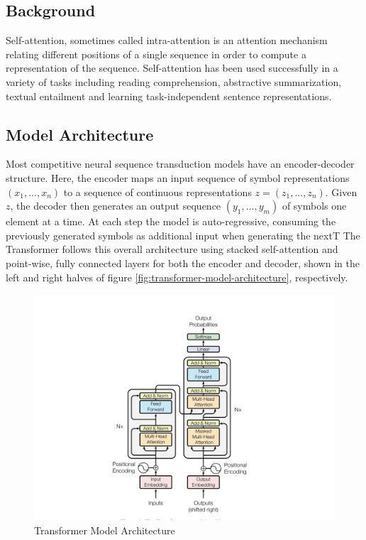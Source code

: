 \documentclass{report}
\begin{document}
\subsection{Background}
\label{ssec:transformers-background}
Self-attention, sometimes called intra-attention is an attention mechanism relating different positions of a single sequence in order to compute a representation of the sequence. Self-attention has been used successfully in a variety of tasks including reading comprehension, abstractive summarization, textual entailment and learning task-independent sentence representations.

\subsection{Model Architecture}
\label{ssec:transformers-model-architecture}
Most competitive neural sequence transduction models have an encoder-decoder structure. Here, the encoder maps an input sequence of symbol representations $(x_1,...,x_n)$ to a sequence of continuous representations $z = (z_1,...,z_n)$. Given $z$, the decoder then generates an output sequence $(y_1, ..., y_m)$ of symbols one element at a time. At each step the model is auto-regressive, consuming the previously generated symbols as additional input when generating the nextT
The Transformer follows this overall architecture using stacked self-attention and point-wise, fully connected layers for both the encoder and decoder, shown in the left and right halves of figure \ref{fig:transformer-model-architecture}, respectively.
\begin{figure}
	\includegraphics{images/transformer/model-architecture.PNG}
	\caption{Transformer Model Architecture}
	\label{fig:transforer-model-architecture}
\end{figure}
\end{document}
